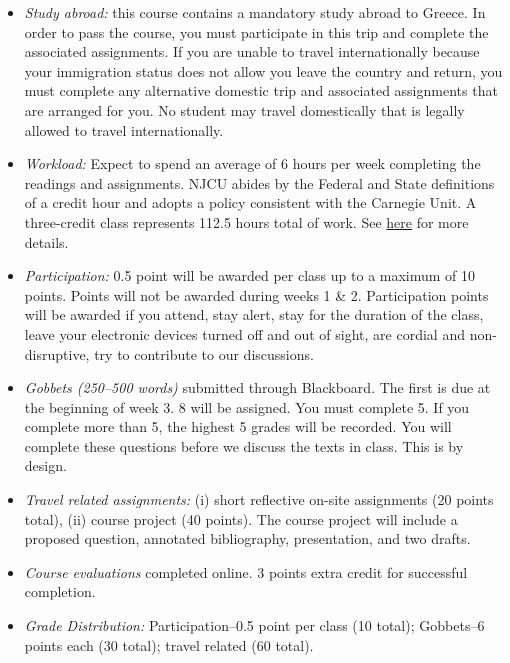 \documentclass[article,oneside]{memoir}
\begin{document}
\begin{itemize}

\item \textit{Study abroad:} this course contains a mandatory study abroad to Greece. In order to pass the course, you must participate in this trip and complete the associated assignments. If you are unable to travel internationally because your immigration status does not allow you leave the country and return, you must complete any alternative domestic trip and associated assignments that are arranged for you. No student may travel domestically that is legally allowed to travel internationally.  

\item \textit{Workload:} Expect to spend an average of 6 hours per week completing the readings and assignments. NJCU abides by the Federal and State definitions of a credit hour and adopts a policy consistent with the Carnegie Unit. A three-credit class represents 112.5 hours total of work. See \href{http://scottoconnor.org/resources/Credit.pdf}{here} for more details.

\item \textit{Participation:} 0.5 point will be awarded per class up to a maximum of 10 points. Points will not be awarded during weeks 1 \& 2. Participation points will be awarded if you attend, stay alert, stay for the duration of the class, leave your electronic devices turned off and out of sight, are cordial and non-disruptive, try to contribute to our discussions. 


\item \textit{Gobbets (250--500 words)} submitted through Blackboard. The first is due at the beginning of week 3. 8 will be assigned. You must complete 5. If you complete more than 5, the highest 5 grades will be recorded. You will complete these questions before we discuss the texts in class. This is by design. 

\item \textit{Travel related assignments:} (i) short reflective on-site assignments (20 points total), (ii) course project (40 points). The course project will include a proposed question, annotated bibliography, presentation, and two drafts. 

\item \textit{Course evaluations} completed online. 3 points extra credit for successful completion.





\item \textit{Grade Distribution:} Participation--0.5 point per class (10 total); Gobbets--6 points each (30 total); travel related  (60 total).


\end{itemize}
\end{document}
